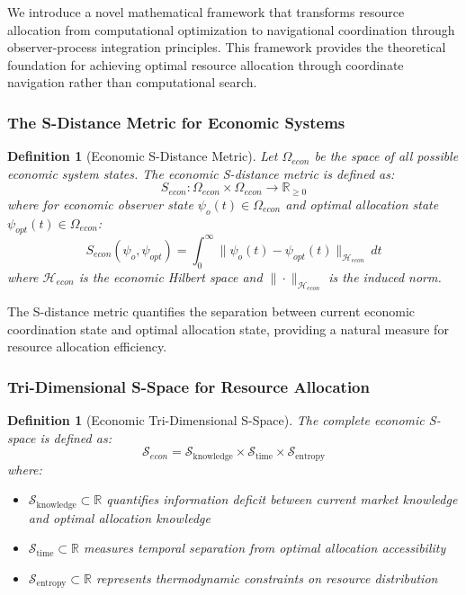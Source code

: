 \documentclass[12pt,a4paper]{article}
\newtheorem{definition}[theorem]{Definition}
\begin{document}
We introduce a novel mathematical framework that transforms resource allocation from computational optimization to navigational coordination through observer-process integration principles. This framework provides the theoretical foundation for achieving optimal resource allocation through coordinate navigation rather than computational search.

\subsubsection{The S-Distance Metric for Economic Systems}

\begin{definition}[Economic S-Distance Metric]
Let $\Omega_{econ}$ be the space of all possible economic system states. The economic S-distance metric is defined as:
\begin{equation}
S_{econ}: \Omega_{econ} \times \Omega_{econ} \to \mathbb{R}_{\geq 0}
\end{equation}
where for economic observer state $\psi_o(t) \in \Omega_{econ}$ and optimal allocation state $\psi_{opt}(t) \in \Omega_{econ}$:
\begin{equation}
S_{econ}(\psi_o, \psi_{opt}) = \int_0^{\infty} \|\psi_o(t) - \psi_{opt}(t)\|_{\mathcal{H}_{econ}} \, dt
\end{equation}
where $\mathcal{H}_{econ}$ is the economic Hilbert space and $\|\cdot\|_{\mathcal{H}_{econ}}$ is the induced norm.
\end{definition}

The S-distance metric quantifies the separation between current economic coordination state and optimal allocation state, providing a natural measure for resource allocation efficiency.

\subsubsection{Tri-Dimensional S-Space for Resource Allocation}

\begin{definition}[Economic Tri-Dimensional S-Space]
The complete economic S-space is defined as:
\begin{equation}
\mathcal{S}_{econ} = \mathcal{S}_{\text{knowledge}} \times \mathcal{S}_{\text{time}} \times \mathcal{S}_{\text{entropy}}
\end{equation}
where:
\begin{itemize}
\item $\mathcal{S}_{\text{knowledge}} \subset \mathbb{R}$ quantifies information deficit between current market knowledge and optimal allocation knowledge
\item $\mathcal{S}_{\text{time}} \subset \mathbb{R}$ measures temporal separation from optimal allocation accessibility  
\item $\mathcal{S}_{\text{entropy}} \subset \mathbb{R}$ represents thermodynamic constraints on resource distribution
\end{itemize}
\end{definition}
\end{document}
